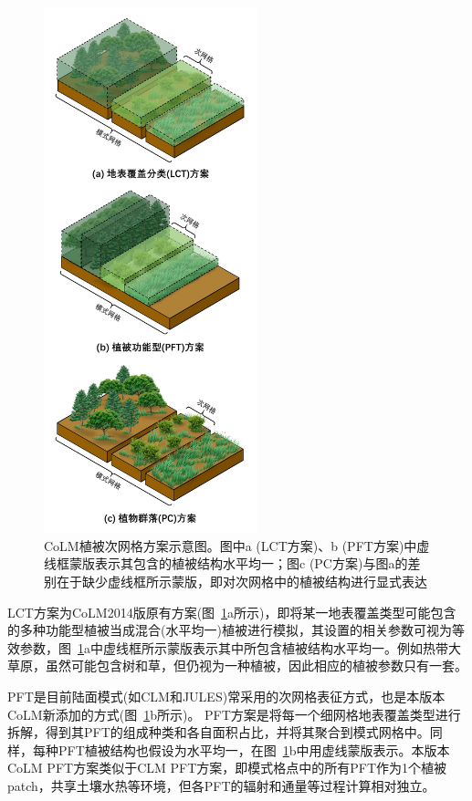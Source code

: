 {
\begin{figure}[htbp]
\centering
\includegraphics[width=0.55\textwidth]{Figures/模式构架/植被次网格方案示意图_v4.jpg}
\caption[CoLM植被次网格方案示意图]{CoLM植被次网格方案示意图。图中a (LCT方案)、b (PFT方案)中虚线框蒙版表示其包含的植被结构水平均一；图c (PC方案)与图a的差别在于缺少虚线框所示蒙版，即对次网格中的植被结构进行显式表达}
\label{fig:植被次网格方案}
\end{figure}
}

LCT方案为CoLM2014版原有方案(图~\ref{fig:植被次网格方案}a所示)，即将某一地表覆盖类型可能包含的多种功能型植被当成混合(水平均一)植被进行模拟，其设置的相关参数可视为等效参数，图~\ref{fig:植被次网格方案}a中虚线框所示蒙版表示其中所包含植被结构水平均一。例如热带大草原，虽然可能包含树和草，但仍视为一种植被，因此相应的植被参数只有一套。

PFT是目前陆面模式(如CLM和JULES)常采用的次网格表征方式，也是本版本CoLM新添加的方式(图~\ref{fig:植被次网格方案}b所示)。
PFT方案是将每一个细网格地表覆盖类型进行拆解，得到其PFT的组成种类和各自面积占比，并将其聚合到模式网格中。同样，每种PFT植被结构也假设为水平均一，在图~\ref{fig:植被次网格方案}b中用虚线蒙版表示。本版本CoLM PFT方案类似于CLM PFT方案，即模式格点中的所有PFT作为1个植被patch，共享土壤水热等环境，但各PFT的辐射和通量等过程计算相对独立。

